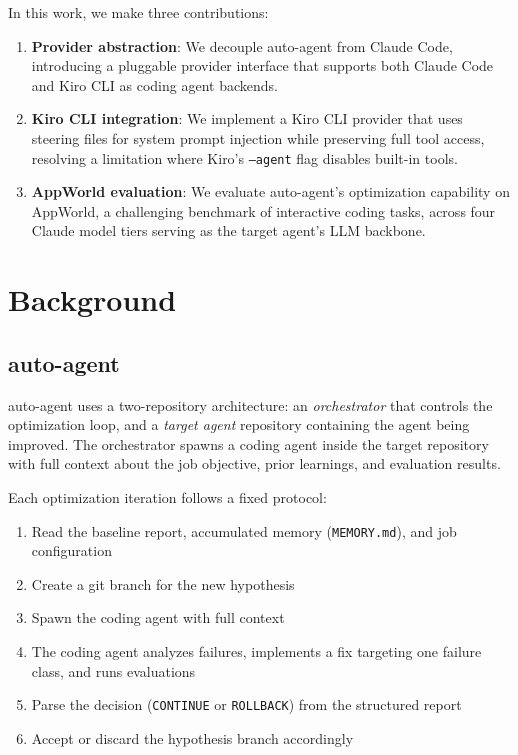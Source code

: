 \documentclass[11pt,a4paper]{article}
\begin{document}
In this work, we make three contributions:

\begin{enumerate}
    \item \textbf{Provider abstraction}: We decouple auto-agent from Claude Code, introducing a pluggable provider interface that supports both Claude Code and Kiro CLI as coding agent backends.
    \item \textbf{Kiro CLI integration}: We implement a Kiro CLI provider that uses steering files for system prompt injection while preserving full tool access, resolving a limitation where Kiro's \texttt{--agent} flag disables built-in tools.
    \item \textbf{AppWorld evaluation}: We evaluate auto-agent's optimization capability on AppWorld, a challenging benchmark of interactive coding tasks, across four Claude model tiers serving as the target agent's LLM backbone.
\end{enumerate}

\section{Background}

\subsection{auto-agent}

auto-agent uses a two-repository architecture: an \emph{orchestrator} that controls the optimization loop, and a \emph{target agent} repository containing the agent being improved. The orchestrator spawns a coding agent inside the target repository with full context about the job objective, prior learnings, and evaluation results.

Each optimization iteration follows a fixed protocol:
\begin{enumerate}
    \item Read the baseline report, accumulated memory (\texttt{MEMORY.md}), and job configuration
    \item Create a git branch for the new hypothesis
    \item Spawn the coding agent with full context
    \item The coding agent analyzes failures, implements a fix targeting one failure class, and runs evaluations
    \item Parse the decision (\texttt{CONTINUE} or \texttt{ROLLBACK}) from the structured report
    \item Accept or discard the hypothesis branch accordingly
\end{enumerate}
\end{document}

